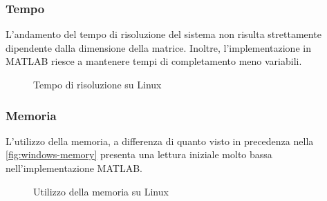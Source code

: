 \documentclass[11pt,italian]{article}
\begin{document}
\subsubsection*{Tempo}
L'andamento del tempo di risoluzione del sistema non risulta strettamente dipendente dalla dimensione della matrice. Inoltre, l'implementazione in MATLAB riesce a mantenere tempi di completamento meno variabili.
\begin{figure}[H]
    \caption{Tempo di risoluzione su Linux}
    \label{fig:linux-time}
\end{figure}

\subsubsection*{Memoria}
L'utilizzo della memoria, a differenza di quanto visto in precedenza nella \cref{fig:windows-memory} presenta una lettura iniziale molto bassa nell'implementazione MATLAB.
\begin{figure}[H]
    \caption{Utilizzo della memoria su Linux}
    \label{fig:linux-memory}
\end{figure}

\smallskip
\end{document}
